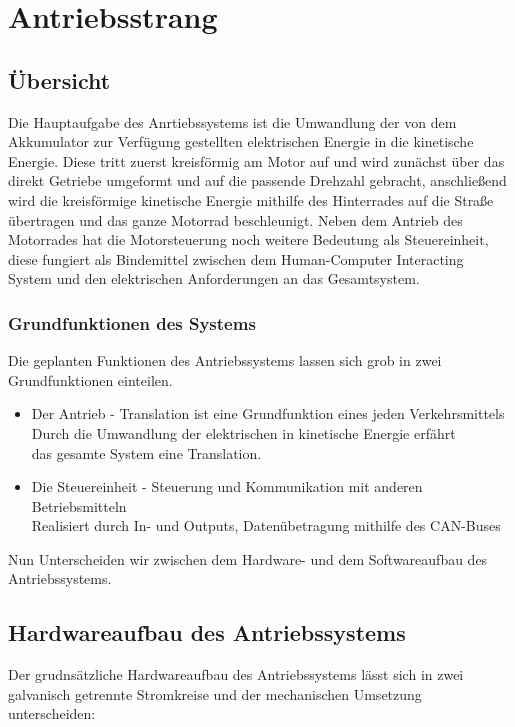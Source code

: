 \chapter{Antriebsstrang}


\section{Übersicht}
Die Hauptaufgabe des Anrtiebssystems ist die Umwandlung der von dem Akkumulator zur Verfügung gestellten elektrischen Energie in die kinetische Energie. Diese tritt zuerst kreisförmig am Motor auf und wird zunächst über das direkt Getriebe umgeformt und auf die passende Drehzahl gebracht, anschließend wird die kreisförmige kinetische Energie mithilfe des Hinterrades auf die Straße übertragen und das ganze Motorrad beschleunigt. Neben dem Antrieb des Motorrades hat die Motorsteuerung noch weitere Bedeutung als Steuereinheit, diese fungiert als Bindemittel zwischen dem Human-Computer Interacting System und den elektrischen Anforderungen an das Gesamtsystem.

\subsection{Grundfunktionen des Systems}
Die geplanten Funktionen des Antriebssystems lassen sich grob in zwei Grundfunktionen einteilen.

\begin{itemize}
	\item Der Antrieb - Translation ist eine Grundfunktion eines jeden Verkehrsmittels
	\\ Durch die Umwandlung der elektrischen in kinetische Energie erfährt 
	\\ das gesamte System eine Translation.
	\item Die Steuereinheit - Steuerung und Kommunikation mit anderen Betriebsmitteln
	\\ Realisiert durch In- und Outputs, Datenübetragung mithilfe des CAN-Buses 
\end{itemize}

Nun Unterscheiden wir zwischen dem Hardware- und dem Softwareaufbau des Antriebssystems.

\newpage


\section{Hardwareaufbau des Antriebssystems}
Der grudnsätzliche Hardwareaufbau des Antriebssystems lässt sich in zwei galvanisch getrennte Stromkreise und der mechanischen Umsetzung unterscheiden:

